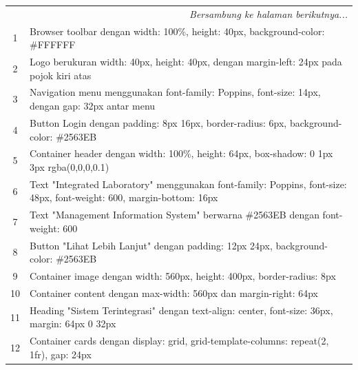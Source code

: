 \begin{enumerate}
\begin{longtable}{|c|p{}|}
		      \hline \multicolumn{2}{|r|}{{\textit{Bersambung ke halaman berikutnya...}}}                                                                     \\
		      \endfoot

		      \hline
		      \endlastfoot

		      1                       & Browser toolbar dengan width: 100\%, height: 40px, background-color: \#FFFFFF                                         \\
		      2                       & Logo berukuran width: 40px, height: 40px, dengan margin-left: 24px pada pojok kiri atas                               \\
		      3                       & Navigation menu menggunakan font-family: Poppins, font-size: 14px, dengan gap: 32px antar menu                        \\
		      4                       & Button Login dengan padding: 8px 16px, border-radius: 6px, background-color: \#2563EB                                 \\
		      5                       & Container header dengan width: 100\%, height: 64px, box-shadow: 0 1px 3px rgba(0,0,0,0.1)                             \\
		      6                       & Text "Integrated Laboratory" menggunakan font-family: Poppins, font-size: 48px, font-weight: 600, margin-bottom: 16px \\
		      7                       & Text "Management Information System" berwarna \#2563EB dengan font-weight: 600                                        \\
		      8                       & Button "Lihat Lebih Lanjut" dengan padding: 12px 24px, background-color: \#2563EB                                     \\
		      9                       & Container image dengan width: 560px, height: 400px, border-radius: 8px                                                \\
		      10                      & Container content dengan max-width: 560px dan margin-right: 64px                                                      \\
		      11                      & Heading "Sistem Terintegrasi" dengan text-align: center, font-size: 36px, margin: 64px 0 32px                         \\
		      12                      & Container cards dengan display: grid, grid-template-columns: repeat(2, 1fr), gap: 24px                                \\

\end{longtable}
\end{enumerate}

